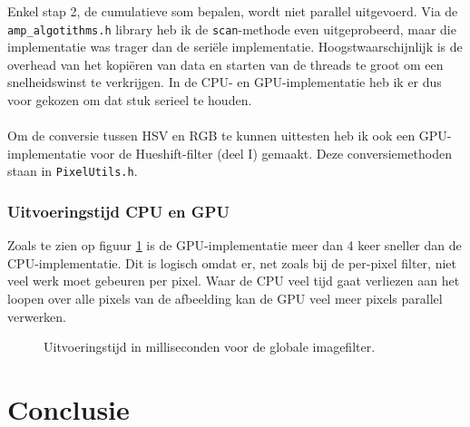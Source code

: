 \documentclass[12pt]{article}
\begin{document}
Enkel stap 2, de cumulatieve som bepalen, wordt niet parallel uitgevoerd.
Via de {\tt amp\_algotithms.h} library heb ik de {\tt scan}-methode even uitgeprobeerd, maar die implementatie was trager dan de seriële implementatie.
Hoogstwaarschijnlijk is de overhead van het kopiëren van data en starten van de threads te groot om een snelheidswinst te verkrijgen.
In de CPU- en GPU-implementatie heb ik er dus voor gekozen om dat stuk serieel te houden.
\\
\\
Om de conversie tussen HSV en RGB te kunnen uittesten heb ik ook een GPU-implementatie voor de Hueshift-filter (deel I) gemaakt.
Deze conversiemethoden staan in {\tt PixelUtils.h}.

\section*{Uitvoeringstijd CPU en GPU}

Zoals te zien op figuur \ref{fig:global} is de GPU-implementatie meer dan 4 keer sneller dan de CPU-implementatie.
Dit is logisch omdat er, net zoals bij de per-pixel filter, niet veel werk moet gebeuren per pixel.
Waar de CPU veel tijd gaat verliezen aan het loopen over alle pixels van de afbeelding kan de GPU veel meer pixels parallel verwerken.

\begin{figure}[H]
    \caption{Uitvoeringstijd in milliseconden voor de globale imagefilter.}
    \label{fig:global}
\end{figure}

\iffalse
\part{Conclusie}
\end{document}
